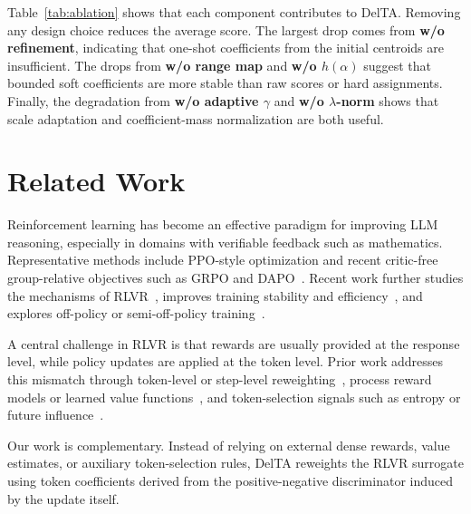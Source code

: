 \documentclass{llmxive}
\begin{document}
Table~\ref{tab:ablation} shows that each component contributes to DelTA.
Removing any design choice reduces the average score.
The largest drop comes from \textbf{w/o refinement}, indicating that one-shot coefficients from the initial centroids are insufficient.
The drops from \textbf{w/o range map} and \textbf{w/o \(h(\alpha)\)} suggest that bounded soft coefficients are more stable than raw scores or hard assignments.
Finally, the degradation from \textbf{w/o adaptive \(\gamma\)} and \textbf{w/o \(\lambda\)-norm} shows that scale adaptation and coefficient-mass normalization are both useful.



\section{Related Work}

Reinforcement learning has become an effective paradigm for improving LLM reasoning, especially in domains with verifiable feedback such as mathematics. Representative methods include PPO-style optimization and recent critic-free group-relative objectives such as GRPO and DAPO~\citep{schulman2017proximal,shao2024deepseekmath,yu2025dapo}. Recent work further studies the mechanisms of RLVR~\citep{yue2025does,huan2025does,meng2026sparse}, improves training stability and efficiency~\citep{zheng2025group,gao2025soft,liu2025understanding}, and explores off-policy or semi-off-policy training~\citep{yan2025learning,zhang2025stephint}. 

A central challenge in RLVR is that rewards are usually provided at the response level, while policy updates are applied at the token level. Prior work addresses this mismatch through token-level or step-level reweighting~\citep{kazemnejad2025vinepporefiningcreditassignment,xie2025capo}, process reward models or learned value functions~\citep{cui2025process,zhang2025lessons}, and token-selection signals such as entropy or future influence~\citep{wang2025beyond,ma2026fipo}. 

Our work is complementary. Instead of relying on external dense rewards, value estimates, or auxiliary token-selection rules, DelTA reweights the RLVR surrogate using token coefficients derived from the positive-negative discriminator induced by the update itself.
\end{document}
